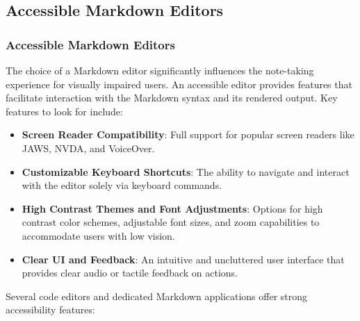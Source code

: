 \subsection{Accessible Markdown Editors}
\subsubsection{Accessible Markdown Editors}

The choice of a Markdown editor significantly influences the note-taking experience for visually impaired users. An accessible editor provides features that facilitate interaction with the Markdown syntax and its rendered output. Key features to look for include:

\begin{itemize}
    \item \textbf{Screen Reader Compatibility}: Full support for popular screen readers like JAWS, NVDA, and VoiceOver. \cite{DailyDevEditors}
    \item \textbf{Customizable Keyboard Shortcuts}: The ability to navigate and interact with the editor solely via keyboard commands. \cite{DailyDevEditors}
    \item \textbf{High Contrast Themes and Font Adjustments}: Options for high contrast color schemes, adjustable font sizes, and zoom capabilities to accommodate users with low vision. \cite{ReciteMe, DailyDevEditors}
    \item \textbf{Clear UI and Feedback}: An intuitive and uncluttered user interface that provides clear audio or tactile feedback on actions. \cite{Inkdrop} \cite{TinyMCE}
\end{itemize}

Several code editors and dedicated Markdown applications offer strong accessibility features:

